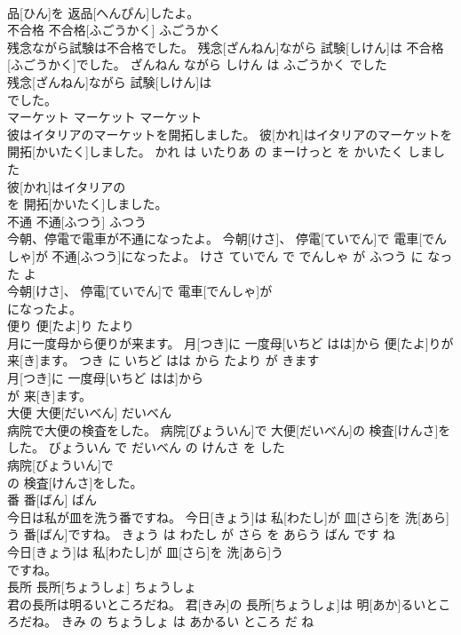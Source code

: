 \documentclass[8pt]{extreport}
\begin{document}
\begin{CJK}{UTF8}{min}
\\	品[ひん]を 返品[へんぴん]したよ。			
\\	不合格	不合格[ふごうかく]	ふごうかく	
\\	残念ながら試験は不合格でした。	残念[ざんねん]ながら 試験[しけん]は 不合格[ふごうかく]でした。	ざんねん ながら しけん は ふごうかく でした	
\\	残念[ざんねん]ながら 試験[しけん]は
\\	でした。			
\\	マーケット	マーケット	マーケット	
\\	彼はイタリアのマーケットを開拓しました。	彼[かれ]はイタリアのマーケットを 開拓[かいたく]しました。	かれ は いたりあ の まーけっと を かいたく しました	
\\	彼[かれ]はイタリアの
\\	を 開拓[かいたく]しました。			
\\	不通	不通[ふつう]	ふつう	
\\	今朝、停電で電車が不通になったよ。	今朝[けさ]、 停電[ていでん]で 電車[でんしゃ]が 不通[ふつう]になったよ。	けさ ていでん で でんしゃ が ふつう に なった よ	
\\	今朝[けさ]、 停電[ていでん]で 電車[でんしゃ]が
\\	になったよ。			
\\	便り	便[たよ]り	たより	
\\	月に一度母から便りが来ます。	月[つき]に 一度母[いちど はは]から 便[たよ]りが 来[き]ます。	つき に いちど はは から たより が きます	
\\	月[つき]に 一度母[いちど はは]から
\\	が 来[き]ます。			
\\	大便	大便[だいべん]	だいべん	
\\	病院で大便の検査をした。	病院[びょういん]で 大便[だいべん]の 検査[けんさ]をした。	びょういん で だいべん の けんさ を した	
\\	病院[びょういん]で
\\	の 検査[けんさ]をした。			
\\	番	番[ばん]	ばん	
\\	今日は私が皿を洗う番ですね。	今日[きょう]は 私[わたし]が 皿[さら]を 洗[あら]う 番[ばん]ですね。	きょう は わたし が さら を あらう ばん です ね	
\\	今日[きょう]は 私[わたし]が 皿[さら]を 洗[あら]う
\\	ですね。			
\\	長所	長所[ちょうしょ]	ちょうしょ	
\\	君の長所は明るいところだね。	君[きみ]の 長所[ちょうしょ]は 明[あか]るいところだね。	きみ の ちょうしょ は あかるい ところ だ ね	

\end{CJK}
\end{document}
